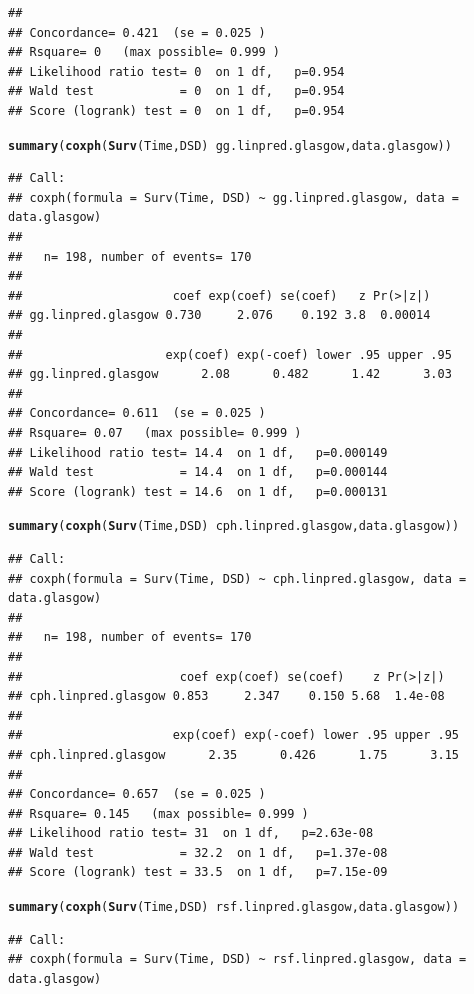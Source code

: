 \documentclass{article}\usepackage[]{graphicx}\usepackage[]{color}
\makeatletter
\newcommand{\hlopt}[1]{\textcolor[rgb]{0,0,0}{#1}}%
\newcommand{\hlstd}[1]{\textcolor[rgb]{0.345,0.345,0.345}{#1}}%
\newcommand{\hlkwd}[1]{\textcolor[rgb]{0.737,0.353,0.396}{\textbf{#1}}}%
\newenvironment{kframe}{%
 \def\at@end@of@kframe{}%
 \ifinner\ifhmode%
  \def\at@end@of@kframe{\end{minipage}}%
  \begin{minipage}{\columnwidth}%
 \fi\fi%
 \def\FrameCommand##1{\hskip\@totalleftmargin \hskip-\fboxsep
 \colorbox{shadecolor}{##1}\hskip-\fboxsep
     \hskip-\linewidth \hskip-\@totalleftmargin \hskip\columnwidth}%
 \MakeFramed {\advance\hsize-\width
   \@totalleftmargin\z@ \linewidth\hsize
   \@setminipage}}%
 {\par\unskip\endMakeFramed%
 \at@end@of@kframe}
\newenvironment{knitrout}{}{} %
\makeatother
\begin{document}
\begin{knitrout}
\begin{kframe}
\begin{verbatim}
## 
## Concordance= 0.421  (se = 0.025 )
## Rsquare= 0   (max possible= 0.999 )
## Likelihood ratio test= 0  on 1 df,   p=0.954
## Wald test            = 0  on 1 df,   p=0.954
## Score (logrank) test = 0  on 1 df,   p=0.954
\end{verbatim}
\begin{alltt}
\hlkwd{summary}\hlstd{(}\hlkwd{coxph}\hlstd{(}\hlkwd{Surv}\hlstd{(Time, DSD)} \hlopt{~} \hlstd{gg.linpred.glasgow, data.glasgow))}
\end{alltt}
\begin{verbatim}
## Call:
## coxph(formula = Surv(Time, DSD) ~ gg.linpred.glasgow, data = data.glasgow)
## 
##   n= 198, number of events= 170 
## 
##                     coef exp(coef) se(coef)   z Pr(>|z|)
## gg.linpred.glasgow 0.730     2.076    0.192 3.8  0.00014
## 
##                    exp(coef) exp(-coef) lower .95 upper .95
## gg.linpred.glasgow      2.08      0.482      1.42      3.03
## 
## Concordance= 0.611  (se = 0.025 )
## Rsquare= 0.07   (max possible= 0.999 )
## Likelihood ratio test= 14.4  on 1 df,   p=0.000149
## Wald test            = 14.4  on 1 df,   p=0.000144
## Score (logrank) test = 14.6  on 1 df,   p=0.000131
\end{verbatim}
\begin{alltt}
\hlkwd{summary}\hlstd{(}\hlkwd{coxph}\hlstd{(}\hlkwd{Surv}\hlstd{(Time, DSD)} \hlopt{~} \hlstd{cph.linpred.glasgow, data.glasgow))}
\end{alltt}
\begin{verbatim}
## Call:
## coxph(formula = Surv(Time, DSD) ~ cph.linpred.glasgow, data = data.glasgow)
## 
##   n= 198, number of events= 170 
## 
##                      coef exp(coef) se(coef)    z Pr(>|z|)
## cph.linpred.glasgow 0.853     2.347    0.150 5.68  1.4e-08
## 
##                     exp(coef) exp(-coef) lower .95 upper .95
## cph.linpred.glasgow      2.35      0.426      1.75      3.15
## 
## Concordance= 0.657  (se = 0.025 )
## Rsquare= 0.145   (max possible= 0.999 )
## Likelihood ratio test= 31  on 1 df,   p=2.63e-08
## Wald test            = 32.2  on 1 df,   p=1.37e-08
## Score (logrank) test = 33.5  on 1 df,   p=7.15e-09
\end{verbatim}
\begin{alltt}
\hlkwd{summary}\hlstd{(}\hlkwd{coxph}\hlstd{(}\hlkwd{Surv}\hlstd{(Time, DSD)} \hlopt{~} \hlstd{rsf.linpred.glasgow, data.glasgow))}
\end{alltt}
\begin{verbatim}
## Call:
## coxph(formula = Surv(Time, DSD) ~ rsf.linpred.glasgow, data = data.glasgow)

\end{verbatim}
\end{kframe}
\end{knitrout}
\end{document}
